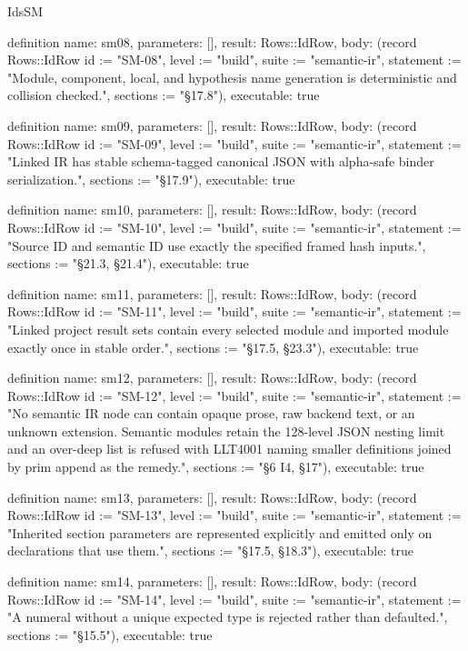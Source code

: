 \begin{lexlean}{IdsSM}
\begin{semanticmodule}
definition{
  name: sm08,
  parameters: [],
  result: Rows::IdRow,
  body: (record Rows::IdRow {id := "SM-08", level := "build", suite := "semantic-ir", statement := "Module, component, local, and hypothesis name generation is deterministic and collision checked.", sections := "§17.8"}),
  executable: true
}

definition{
  name: sm09,
  parameters: [],
  result: Rows::IdRow,
  body: (record Rows::IdRow {id := "SM-09", level := "build", suite := "semantic-ir", statement := "Linked IR has stable schema-tagged canonical JSON with alpha-safe binder serialization.", sections := "§17.9"}),
  executable: true
}

definition{
  name: sm10,
  parameters: [],
  result: Rows::IdRow,
  body: (record Rows::IdRow {id := "SM-10", level := "build", suite := "semantic-ir", statement := "Source ID and semantic ID use exactly the specified framed hash inputs.", sections := "§21.3, §21.4"}),
  executable: true
}

definition{
  name: sm11,
  parameters: [],
  result: Rows::IdRow,
  body: (record Rows::IdRow {id := "SM-11", level := "build", suite := "semantic-ir", statement := "Linked project result sets contain every selected module and imported module exactly once in stable order.", sections := "§17.5, §23.3"}),
  executable: true
}

definition{
  name: sm12,
  parameters: [],
  result: Rows::IdRow,
  body: (record Rows::IdRow {id := "SM-12", level := "build", suite := "semantic-ir", statement := "No semantic IR node can contain opaque prose, raw backend text, or an unknown extension. Semantic modules retain the 128-level JSON nesting limit and an over-deep list is refused with LLT4001 naming smaller definitions joined by prim append as the remedy.", sections := "§6 I4, §17"}),
  executable: true
}

definition{
  name: sm13,
  parameters: [],
  result: Rows::IdRow,
  body: (record Rows::IdRow {id := "SM-13", level := "build", suite := "semantic-ir", statement := "Inherited section parameters are represented explicitly and emitted only on declarations that use them.", sections := "§17.5, §18.3"}),
  executable: true
}

definition{
  name: sm14,
  parameters: [],
  result: Rows::IdRow,
  body: (record Rows::IdRow {id := "SM-14", level := "build", suite := "semantic-ir", statement := "A numeral without a unique expected type is rejected rather than defaulted.", sections := "§15.5"}),
  executable: true
}


\end{semanticmodule}
\end{lexlean}
